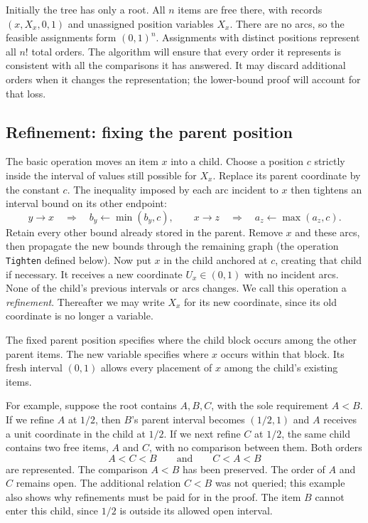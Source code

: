 Initially the tree has only a root. All $n$ items are free there, with
records $(x,X_x,0,1)$ and unassigned position variables $X_x$. There are
no arcs, so the feasible assignments form $(0,1)^n$. Assignments with
distinct positions represent all $n!$ total orders.
The algorithm will ensure that every order it represents is consistent
with all the comparisons it has answered. It may discard additional orders
when it changes the representation; the lower-bound proof will account for
that loss.

\subsection{Refinement: fixing the parent position}

The basic operation moves an item $x$ into a child. Choose a position $c$
strictly inside the interval of values still possible for $X_x$. Replace
its parent coordinate by the constant $c$. The inequality imposed by each
arc incident to $x$ then tightens an interval bound on its other endpoint:
\[
y\to x\quad\Longrightarrow\quad b_y\gets\min(b_y,c),
\qquad
x\to z\quad\Longrightarrow\quad a_z\gets\max(a_z,c).
\]
Retain every other bound already stored in the parent. Remove $x$ and
these arcs, then propagate the new bounds through the remaining graph
(the operation \texttt{Tighten} defined below). Now put $x$ in the
child anchored at $c$, creating that child if necessary. It receives a new
coordinate $U_x\in(0,1)$ with no incident arcs. None of the child's
previous intervals or arcs changes. We call this operation a
\emph{refinement}. Thereafter we may write $X_x$ for its new coordinate,
since its old coordinate is no longer a variable.

The fixed parent position specifies
where the child block occurs among the other parent items. The new variable
specifies where $x$ occurs within that block. Its fresh interval $(0,1)$
allows every placement of $x$ among the child's existing items.

For example, suppose the root contains $A,B,C$, with the sole requirement
$A<B$. If we refine $A$ at $1/2$, then $B$'s parent interval becomes
$(1/2,1)$ and $A$ receives a unit coordinate in the child at $1/2$.
If we next refine $C$ at $1/2$, the same child contains two free items, $A$
and $C$, with no comparison between them. Both orders
\[
A<C<B\qquad\text{and}\qquad C<A<B
\]
are represented. The comparison $A<B$ has been preserved. The order of
$A$ and $C$ remains open. The additional relation $C<B$ was not queried;
this example also shows why refinements must be paid for in the proof.
The item $B$ cannot enter this child, since $1/2$ is outside its allowed
open interval.

